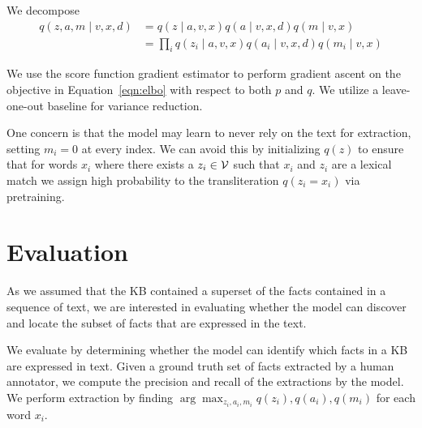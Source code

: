 \documentclass[12pt]{article}
\begin{document}
We decompose 
\begin{equation}
\label{eqn:elbo}
\begin{aligned}
q(z,a,m\mid v,x,d) &= q(z \mid a,v,x)q(a\mid v,x,d)q(m \mid v,x)\\
&= \prod_i q(z_i \mid a,v,x)q(a_i \mid v,x,d)q(m_i \mid v,x)
\end{aligned}
\end{equation}

We use the score function gradient estimator to perform gradient ascent on the objective
in Equation~\ref{eqn:elbo} with respect to both $p$ and $q$.
We utilize a leave-one-out baseline for variance reduction.

One concern is that the model may learn to never rely on the text for extraction,
setting $m_i = 0$ at every index.
We can avoid this by initializing $q(z)$ to ensure that for words $x_i$
where there exists a $z_i \in \mathcal{V}$ such that $x_i$ and $z_i$ are a lexical match
we assign high probability to the transliteration $q(z_i = x_i)$
via pretraining.

\section{Evaluation}
As we assumed that the KB contained a superset of the facts contained in
a sequence of text, we are interested in evaluating whether the model can discover
and locate the subset of facts that are expressed in the text.

We evaluate by determining whether the model can identify which facts in a KB
are expressed in text.
Given a ground truth set of facts extracted by a human annotator,
we compute the precision and recall of the extractions by the model.
We perform extraction by finding $\arg\max_{z_i,a_i,m_i}q(z_i),q(a_i),q(m_i)$
for each word $x_i$.
\end{document}
